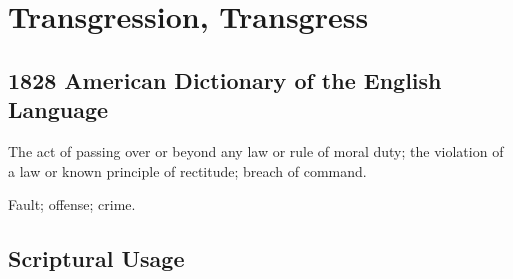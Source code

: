 \section{Transgression, Transgress}
	\label{TRANSGRESSION}
	

\subsection{1828 American Dictionary of the English Language} %
	\label{TRANSGRESSION-1828}

	\begin{compactitem}
		\item The act of passing over or beyond any law or rule of moral duty; the violation of a law or known principle of rectitude; breach of command.
		\item[1] Fault; offense; crime.
	\end{compactitem}



\subsection{Scriptural Usage} %
	\label{TRANSGRESSION-SCRIPTURES}

	
